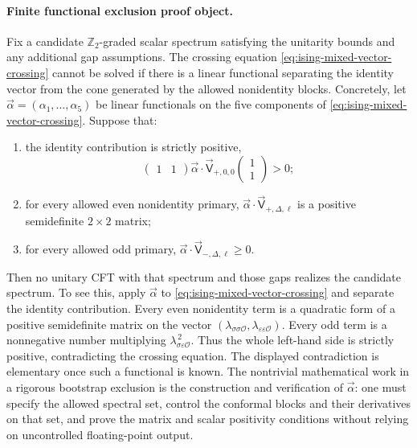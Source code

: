 \paragraph{Finite functional exclusion proof object.}
Fix a candidate \(\mathbb Z_2\)-graded scalar spectrum satisfying the
unitarity bounds and any additional gap assumptions.  The crossing equation
\eqref{eq:ising-mixed-vector-crossing} cannot be solved if there is a linear
functional separating the identity vector from the cone generated by the
allowed nonidentity blocks.  Concretely, let
\(\vec\alpha=(\alpha_1,\ldots,\alpha_5)\) be linear functionals on the
five components of \eqref{eq:ising-mixed-vector-crossing}.  Suppose that:
\begin{enumerate}
  \item the identity contribution is strictly positive,
  \[
    \begin{pmatrix}1&1\end{pmatrix}
    \vec\alpha\cdot\vec{\mathsf V}_{+,0,0}
    \begin{pmatrix}1\\1\end{pmatrix}>0;
  \]
  \item for every allowed even nonidentity primary,
  \(\vec\alpha\cdot\vec{\mathsf V}_{+,\Delta,\ell}\) is a positive
  semidefinite \(2\times2\) matrix;
  \item for every allowed odd primary,
  \(\vec\alpha\cdot\vec{\mathsf V}_{-,\Delta,\ell}\ge0\).
\end{enumerate}
Then no unitary CFT with that spectrum and those gaps realizes the candidate
spectrum.  To see this, apply \(\vec\alpha\) to
\eqref{eq:ising-mixed-vector-crossing} and separate
the identity contribution.  Every even nonidentity term is a quadratic form
of a positive semidefinite matrix on the vector
\((\lambda_{\sigma\sigma\mathcal O},
\lambda_{\varepsilon\varepsilon\mathcal O})\).  Every odd term is a
nonnegative number multiplying \(\lambda_{\sigma\varepsilon\mathcal O}^{\,2}\).
Thus the whole left-hand side is strictly positive, contradicting the
crossing equation.
The displayed contradiction is elementary once such a functional is known.
The nontrivial mathematical work in a rigorous bootstrap exclusion is the
construction and verification of \(\vec\alpha\): one must specify the allowed
spectral set, control the conformal blocks and their derivatives on that set,
and prove the matrix and scalar positivity conditions without relying on
uncontrolled floating-point output.

